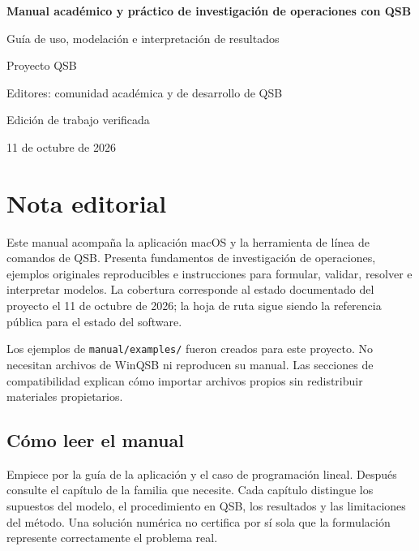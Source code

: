\documentclass[11pt,openany]{book}
\theoremstyle{definition}
\newcommand{\qsb}{\textnormal{\textsc{QSB}}}
\begin{document}
\frontmatter

\begin{titlepage}
  \centering
  \vspace*{2cm}
  {\Huge\bfseries Manual académico y práctico de investigación de operaciones con \qsb\par}
  \vspace{1.5cm}
  {\Large Guía de uso, modelación e interpretación de resultados\par}
  \vspace{2cm}
  {\large Proyecto QSB\par}
  \vspace{0.4cm}
  {\large Editores: comunidad académica y de desarrollo de QSB\par}
  \vfill
  {\large Edición de trabajo verificada\par}
  {\large 11 de octubre de 2026\par}
\end{titlepage}

\chapter*{Nota editorial}
Este manual acompaña la aplicación macOS y la herramienta de línea de comandos
 de \qsb{}. Presenta fundamentos de investigación de operaciones, ejemplos
 originales reproducibles e instrucciones para formular, validar, resolver e
 interpretar modelos. La cobertura corresponde al estado documentado del proyecto
 el 11 de octubre de 2026; la hoja de ruta sigue siendo la referencia pública
 para el estado del software.

Los ejemplos de \texttt{manual/examples/} fueron creados para este proyecto.
 No necesitan archivos de WinQSB ni reproducen su manual. Las secciones de
 compatibilidad explican cómo importar archivos propios sin redistribuir
 materiales propietarios.

\section*{Cómo leer el manual}
Empiece por la guía de la aplicación y el caso de programación lineal. Después
 consulte el capítulo de la familia que necesite. Cada capítulo distingue los
 supuestos del modelo, el procedimiento en QSB, los resultados y las limitaciones
 del método. Una solución numérica no certifica por sí sola que la formulación
 represente correctamente el problema real.
\end{document}
